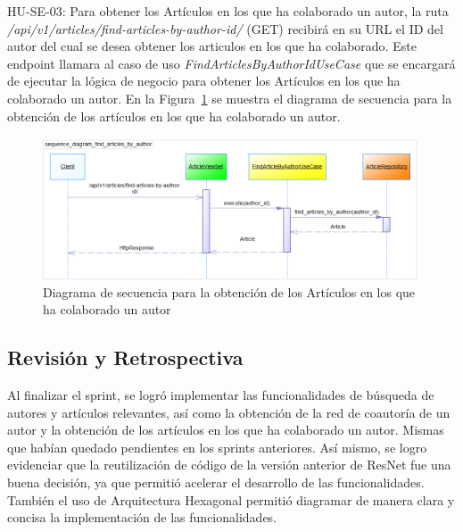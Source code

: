 HU-SE-03: Para obtener los Artículos en los que ha colaborado un autor, la ruta \textit{/api/v1/articles/find-articles-by-author-id/} (GET) recibirá en su URL el ID del autor del cual se desea obtener los articulos en los que ha colaborado.
Este endpoint llamara al caso de uso \textit{FindArticlesByAuthorIdUseCase} que se encargará de ejecutar la lógica de negocio para obtener los Artículos en los que ha colaborado un autor.
En la Figura~\ref{fig:sequence-diagram-find-articles-by-author-id} se muestra el diagrama de secuencia para la obtención de los artículos en los que ha colaborado un autor.
\begin{figure}[H]
    \centering
    \includegraphics[scale=0.7]{../02Figures/02Chapter/Sprints/Sprint-4/sequence_diagram_find_articles_by_author.png}
    \caption{Diagrama de secuencia para la obtención de los Artículos en los que ha colaborado un autor}\label{fig:sequence-diagram-find-articles-by-author-id}
\end{figure}

\subsection{Revisión y Retrospectiva}
Al finalizar el sprint, se logró implementar las funcionalidades de búsqueda de autores y artículos relevantes, así como la obtención de la red de coautoría de un autor y la obtención de los artículos en los que ha colaborado un autor.
Mismas que habían quedado pendientes en los sprints anteriores. 
Así mismo, se logro evidenciar que la reutilización de código de la versión anterior de ResNet fue una buena decisión, ya que permitió acelerar el desarrollo de las funcionalidades.
También el uso de Arquitectura Hexagonal permitió diagramar de manera clara y concisa la implementación de las funcionalidades.
